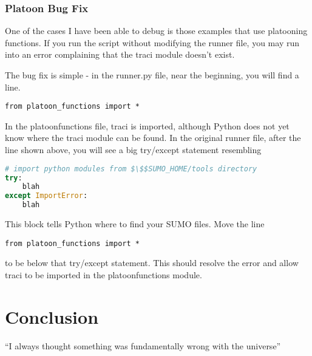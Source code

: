 \documentclass{article}
\begin{document}
\subsubsection{Platoon Bug Fix}
One of the cases I have been able to debug is those examples that use platooning functions. If you run the script without modifying the runner file, you may run into an error complaining that the traci module doesn't exist. 

The bug fix is simple - in the runner.py file, near the beginning, you will find a line. 
\begin{lstlisting}
from platoon_functions import *
\end{lstlisting}
In the platoon\textunderscore functions file, traci is imported, although Python does not yet know where the traci module can be found. In the original runner file, after the line shown above, you will see a big try/except statement resembling
\begin{lstlisting}[language=Python]
# import python modules from $\$$SUMO_HOME/tools directory
try:
    blah
except ImportError:
    blah
\end{lstlisting}
This block tells Python where to find your SUMO files. Move the line
\begin{lstlisting}
from platoon_functions import *
\end{lstlisting}
to be below that try/except statement. This should resolve the error and allow traci to be imported in the platoon\textunderscore functions module. 

\section{Conclusion}
``I always thought something was fundamentally wrong with the universe'' \citep{adams1995hitchhiker}



\end{document}
